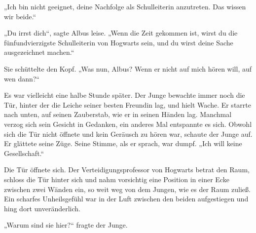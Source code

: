 „Ich bin nicht geeignet, deine Nachfolge als Schulleiterin anzutreten. Das wissen wir beide.“

„Du irrst dich“, sagte Albus leise.
„Wenn die Zeit gekommen ist, wirst du die fünfundvierzigste Schulleiterin von Hogwarts sein, und du wirst deine Sache ausgezeichnet machen.“

Sie schüttelte den Kopf.
„Was nun, Albus? Wenn er nicht auf mich hören will, auf wen dann?“

\later


Es war vielleicht eine halbe Stunde später. Der Junge bewachte immer noch die Tür, hinter der die Leiche seiner besten Freundin lag, und hielt Wache. Er starrte nach unten, auf seinen Zauberstab, wie er in seinen Händen lag. Manchmal verzog sich sein Gesicht in Gedanken, ein anderes Mal entspannte es sich. Obwohl sich die Tür nicht öffnete und kein Geräusch zu hören war, schaute der Junge auf. Er glättete seine Züge. Seine Stimme, als er sprach, war dumpf.
„Ich will keine Gesellschaft.“


Die Tür öffnete sich. Der Verteidigungsprofessor von Hogwarts betrat den Raum, schloss die Tür hinter sich und nahm vorsichtig eine Position in einer Ecke zwischen zwei Wänden ein, so weit weg von dem Jungen, wie es der Raum zuließ. Ein scharfes Unheilsgefühl war in der Luft zwischen den beiden aufgestiegen und hing dort unveränderlich.

„Warum sind sie hier?“ fragte der Junge.

